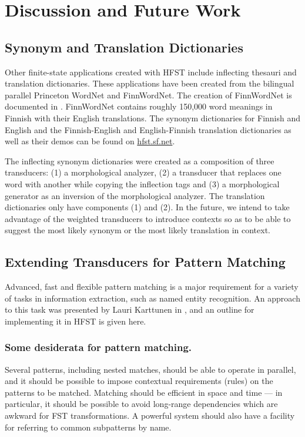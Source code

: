 \documentclass{llncs}
\begin{document}
\section{Discussion and Future Work}\label{Discussion}

\subsection{Synonym and Translation Dictionaries}

Other finite-state applications created with HFST include inflecting thesauri and translation dictionaries.
These applications have been created from the bilingual parallel Princeton WordNet and FinnWordNet. 
The creation of FinnWordNet is documented in \cite{linden/2010}. FinnWordNet contains roughly 150,000 
word meanings in Finnish with their English translations. The synonym dictionaries for Finnish and English
and the Finnish-English and English-Finnish translation dictionaries as well as their demos can be found on \url{hfst.sf.net}.

The inflecting synonym dictionaries were created as a composition of three transducers: (1) a morphological analyzer,
(2) a transducer that replaces one word with another while copying the inflection tags and (3) a morphological
generator as an inversion of the morphological analyzer. The translation dictionaries only have components (1) and (2).
In the future, we intend to take advantage of the weighted transducers to introduce contexts so as to be able to
suggest the most likely synonym or the most likely translation in context.

\subsection{Extending Transducers for Pattern Matching}

Advanced, fast and flexible pattern matching is a major requirement for a
variety of tasks in information extraction, such as named entity recognition.
An approach to this task was presented by Lauri Karttunen in
\cite{karttunen/2011}, and an outline for implementing it in HFST is given here.

\subsubsection{Some desiderata for pattern matching.} Several patterns,
including nested matches, should be able to operate in parallel, and
it should be possible to impose contextual requirements (rules) on
the patterns to be matched. Matching should be efficient in space and
time --- in particular, it should be possible to avoid long-range
dependencies which are awkward for FST transformations.
A powerful system should also have a facility for referring
to common subpatterns by name.
\end{document}
